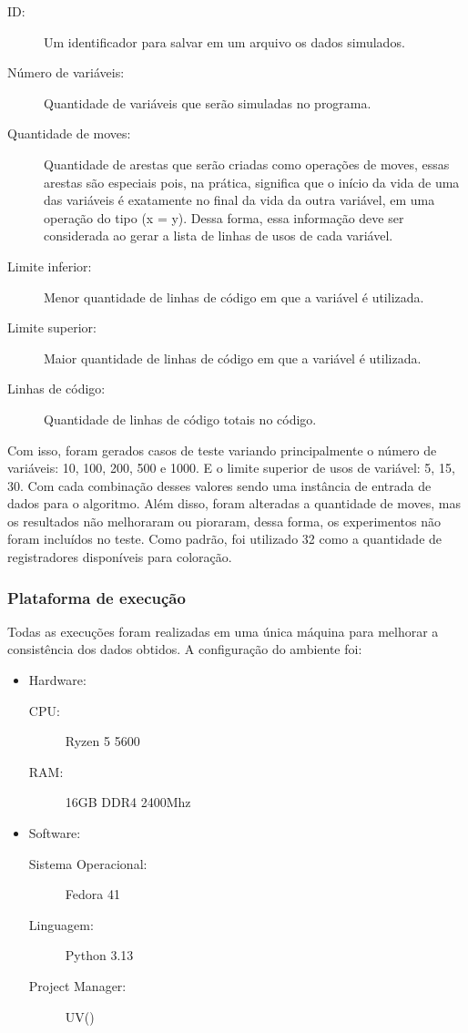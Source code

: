 \begin{description}
  \item[ID:] Um identificador para salvar em um arquivo os dados simulados.
  \item[Número de variáveis:] Quantidade de variáveis que serão simuladas no programa.
  \item[Quantidade de moves:] Quantidade de arestas que serão criadas como operações de moves, essas arestas são especiais pois, na prática, significa que o início 
    da vida de uma das variáveis é exatamente no final da vida da outra variável, em uma operação do tipo (x = y). Dessa forma, essa informação deve ser considerada
    ao gerar a lista de linhas de usos de cada variável.
  \item[Limite inferior:] Menor quantidade de linhas de código em que a variável é utilizada.
  \item[Limite superior:] Maior quantidade de linhas de código em que a variável é utilizada.
  \item[Linhas de código:] Quantidade de linhas de código totais no código.
\end{description}

Com isso, foram gerados casos de teste variando principalmente o 
número de variáveis: 10, 100, 200, 500 e 1000. E o limite superior de usos de variável: 5, 15, 30. 
Com cada combinação desses valores sendo uma instância de entrada de dados para o algoritmo. Além disso, foram alteradas a quantidade de moves, mas os resultados
não melhoraram ou pioraram, dessa forma, os experimentos não foram incluídos no teste. Como padrão, foi utilizado 32 como a quantidade de registradores disponíveis para coloração.

\subsubsection{Plataforma de execução}

Todas as execuções foram realizadas em uma única máquina para melhorar a consistência dos dados obtidos. A configuração do ambiente foi:

\begin{itemize}
  \item Hardware:
    \begin{description}
      \item[CPU:] Ryzen 5 5600
      \item[RAM:] 16GB DDR4 2400Mhz
    \end{description}
  \item Software:
    \begin{description}
      \item[Sistema Operacional:] Fedora 41
      \item[Linguagem:] Python 3.13
      \item[Project Manager:] UV(\textcite{uv})
    \end{description}
\end{itemize}


